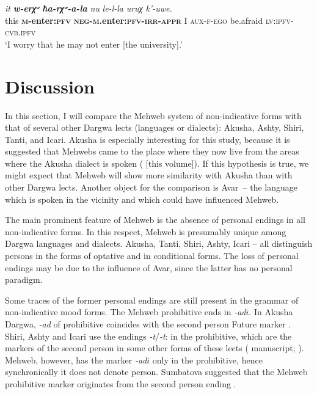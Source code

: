 ﻿\documentclass[output=paper]{langsci/langscibook}
\begin{document}
\ea %
\gll \emph{it} \emph{\textbf{w-erχʷ}} \emph{\textbf{ħa-rχʷ-a-la}} \emph{nu} \emph{le-l-la} \emph{uruχ} \emph{k'-uwe.}\\
 this \textbf{\textsc{m}-enter:\textsc{pfv}} \textbf{\textsc{neg}-\textsc{m}.enter:\textsc{pfv}-\textsc{irr}-\textsc{appr}} I \textsc{aux}-\textsc{f}-\textsc{ego} be.afraid \textsc{lv}:\textsc{ipfv}-\textsc{cvb.ipfv} \\
\glt `I worry that he may not enter [the university].'
\z

\removelastskip
{}

\section{Discussion}\label{discussion}

In this section, I will compare the Mehweb system of non-indicative
forms with that of several other Dargwa lects (languages or dialects):
Akusha, Ashty, Shiri, Tanti, and Icari. Akusha is especially interesting
for this study, because it is suggested that Mehwebs came to the place
where they now live from the areas where the Akusha dialect is spoken
(\citealt{dobrushina2019a} [this volume]). If this hypothesis is true, we might expect
that Mehweb will show more similarity with Akusha than with other Dargwa
lects. Another object for the comparison is Avar~– the language which
is spoken in the vicinity and which could have influenced Mehweb.

The main prominent feature of Mehweb is the absence of personal endings
in all non-indicative forms. In this respect, Mehweb is presumably
unique among Dargwa languages and dialects. Akusha, Tanti, Shiri, Ashty,
Icari – all distinguish persons in the forms of optative and in
conditional forms. The loss of personal endings may be due to the
influence of Avar, since the latter has no personal paradigm.

Some traces of the former personal endings are still present in the
grammar of non-indicative mood forms. The Mehweb prohibitive ends in
\emph{-ad\(i\)}. In Akusha Dargwa, \emph{-ad} of prohibitive coincides
with the second person Future marker \citep[36]{vandenberg2001}. Shiri,
Ashty and Icari use the endings \emph{-t}/\emph{-t}: in the prohibitive, which are
the markers of the second person in some other forms of these lects
(\citealt{belyaev:shiri} manuscript; \citealt{mutalov-sumbatova2003}).
Mehweb, however, has the
marker \emph{-ad\(i\)} only in the prohibitive, hence synchronically it
does not denote person. Sumbatova suggested that the Mehweb prohibitive
marker originates from the second person ending \citep[590]{sumbatova-lander2014}.
\end{document}

